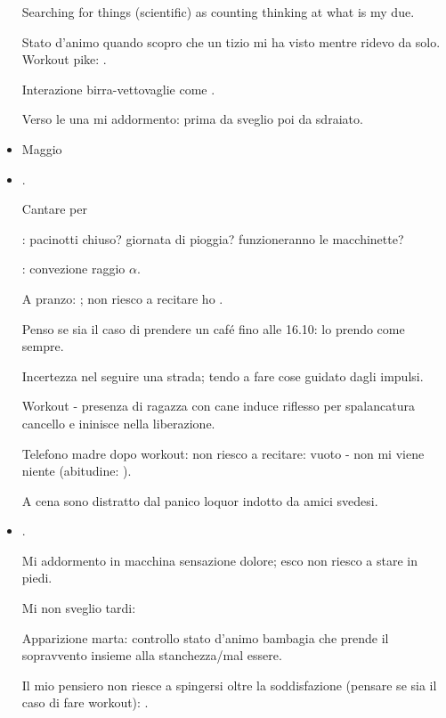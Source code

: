 \begin{itemize}
Searching for things (scientific) as counting thinking at what is my due.

Stato d'animo quando scopro che un tizio mi ha visto mentre ridevo da solo.
Workout pike: .

Interazione birra-vettovaglie come .

Verso le una mi addormento: prima da sveglio poi da sdraiato.


\item Maggio

\item {}.

Cantare per 

: pacinotti chiuso? giornata di pioggia? funzioneranno le macchinette?

: convezione raggio $\alpha$.

A pranzo: ; non riesco a recitare ho .

Penso se sia il caso di prendere un caf\'e fino alle 16.10: lo prendo come sempre.

Incertezza nel seguire una strada; tendo a fare cose guidato dagli impulsi.

Workout - presenza di ragazza con cane induce riflesso per spalancatura cancello e ininisce nella liberazione.

Telefono madre dopo workout: non riesco a recitare: vuoto - non mi viene niente (abitudine: ).

A cena sono distratto dal panico loquor indotto da amici svedesi.

\item {}.

Mi addormento in macchina sensazione dolore; esco non riesco a stare in piedi.

Mi non sveglio tardi: 

Apparizione marta: controllo stato d'animo bambagia che prende il sopravvento insieme alla stanchezza/mal essere.

Il mio pensiero non riesce a spingersi oltre la soddisfazione (pensare se sia il caso di fare workout): .


\end{itemize}
